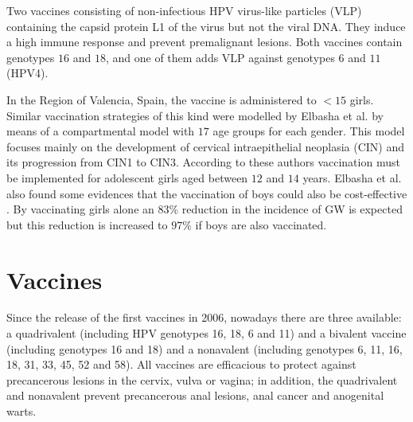 Two vaccines consisting of non-infectious HPV virus-like particles (VLP) \cite{mcneil2006invented} containing the capsid protein L1 of the virus but not the viral DNA. They induce a high immune response and prevent premalignant lesions. Both vaccines contain genotypes $16$ and $18$, and one of them adds VLP against genotypes $6$ and $11$ (HPV4).

In the Region of Valencia, Spain, the vaccine is administered to $< 15$ girls. Similar vaccination strategies of this kind were modelled by Elbasha et al. \cite{elbasha2007model,elbasha2005vaccination} by means of a compartmental model with $17$ age groups for each gender. This model focuses mainly on the development of cervical intraepithelial neoplasia (CIN) and its progression from CIN1 to CIN3. According to these authors vaccination must be implemented for adolescent girls aged between $12$ and $14$ years. Elbasha et al. also found some evidences that the vaccination of boys could also be cost-effective \cite{elbasha2007model}. By vaccinating girls alone an $83\%$ reduction in the incidence of GW is expected but this reduction is increased to $97\%$ if boys are also vaccinated.


\section{Vaccines}
Since the release of the first vaccines in 2006, nowadays there are three available: a quadrivalent (including HPV genotypes 16, 18, 6 and 11) and a bivalent vaccine (including genotypes 16 and 18) and a nonavalent (including genotypes 6, 11, 16, 18, 31, 33, 45, 52 and 58). All vaccines are efficacious to protect against precancerous lesions in the cervix, vulva or vagina; in addition, the quadrivalent and nonavalent prevent precancerous anal lesions, anal cancer and anogenital warts.  

